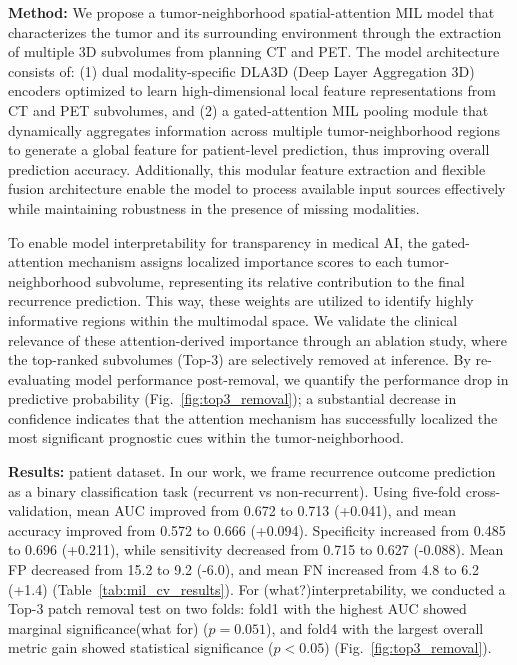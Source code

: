 \documentclass[a4paper]{article}
\begin{document}
\textbf{Method:}
We propose a tumor-neighborhood spatial-attention MIL model that characterizes the tumor and its surrounding environment through the extraction of multiple 3D subvolumes from planning CT and PET. 
The model architecture consists of: (1) dual modality-specific DLA3D (Deep Layer Aggregation 3D) encoders optimized to learn high-dimensional local feature representations from CT and PET subvolumes, 
and (2) a gated-attention MIL pooling module that dynamically aggregates information across multiple tumor-neighborhood regions to generate a global feature for patient-level prediction, thus improving overall prediction accuracy. 
Additionally, this modular feature extraction and flexible fusion architecture enable the model to process available input sources effectively while maintaining robustness in the presence of missing modalities.

To enable model interpretability for transparency in medical AI, the gated-attention mechanism assigns localized importance scores to each tumor-neighborhood subvolume, 
representing its relative contribution to the final recurrence prediction. 
This way, these weights are utilized to identify highly informative regions within the multimodal space. 
We validate the clinical relevance of these attention-derived importance through an ablation study, where the top-ranked subvolumes (Top-3) are selectively removed at inference. 
By re-evaluating model performance post-removal, we quantify the performance drop in predictive probability (Fig.~\ref{fig:top3_removal}); 
a substantial decrease in confidence indicates that the attention mechanism has successfully localized the most significant prognostic cues within the tumor-neighborhood.


\textbf{Results:}
 patient dataset. In our work, we frame recurrence outcome prediction as a binary classification task (recurrent vs non-recurrent). Using five-fold cross-validation, mean AUC improved from 0.672 to 0.713 (+0.041), and mean accuracy improved from 0.572 to 0.666 (+0.094). Specificity increased from 0.485 to 0.696 (+0.211), while sensitivity decreased from 0.715 to 0.627 (-0.088). Mean FP decreased from 15.2 to 9.2 (-6.0), and mean FN increased from 4.8 to 6.2 (+1.4) (Table~\ref{tab:mil_cv_results}). For (what?)interpretability, we conducted a Top-3 patch removal test on two folds: fold1 with the highest AUC showed marginal significance(what for) ($p=0.051$), and fold4 with the largest overall metric gain showed statistical significance ($p<0.05$) (Fig.~\ref{fig:top3_removal}).
\end{document}

